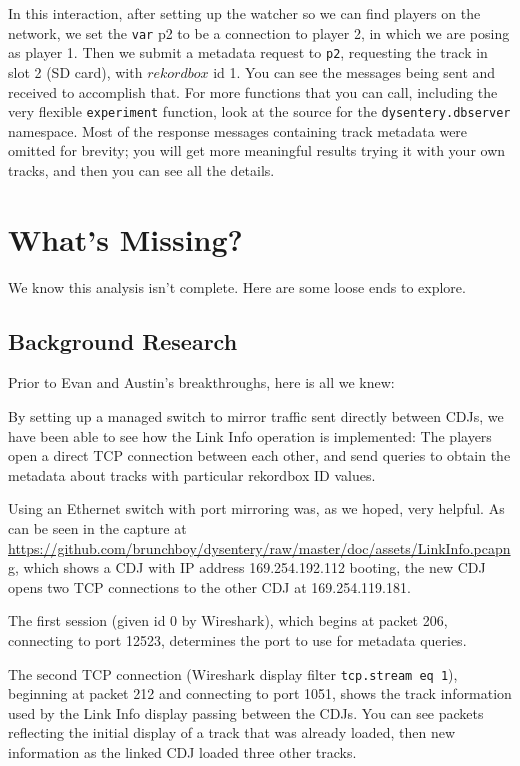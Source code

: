 \documentclass[11pt]{article}
\begin{document}
In this interaction, after setting up the watcher so we can find
players on the network, we set the {\tt var} p2 to be a connection to
player 2, in which we are posing as player 1. Then we submit a
metadata request to {\tt p2}, requesting the track in slot 2 (SD
card), with $rekordbox$ id 1. You can see the messages being sent and
received to accomplish that. For more functions that you can call,
including the very flexible {\tt experiment} function, look at the
source for the {\tt dysentery.dbserver} namespace. Most of the
response messages containing track metadata were omitted for brevity;
you will get more meaningful results trying it with your own tracks,
and then you can see all the details.

\section{What's Missing?}

We know this analysis isn't complete. Here are some loose ends to
explore.

\subsection{Background Research}

Prior to Evan and Austin's breakthroughs, here is all we knew:

By setting up a managed switch to mirror traffic sent directly between
CDJs, we have been able to see how the Link Info operation is
implemented: The players open a direct TCP connection between each
other, and send queries to obtain the metadata about tracks with
particular rekordbox ID values.

Using an Ethernet switch
with port mirroring was, as we hoped, very helpful. As can be seen in
the capture at
\url{https://github.com/brunchboy/dysentery/raw/master/doc/assets/LinkInfo.pcapng},
which shows a CDJ with IP address 169.254.192.112 booting, the new CDJ
opens two TCP connections to the other CDJ at 169.254.119.181.

The first session (given id 0 by Wireshark), which begins at packet
206, connecting to port 12523, determines the port to use for metadata
queries.

The second TCP connection (Wireshark display filter {\tt tcp.stream eq
  1}), beginning at packet 212 and connecting to port 1051, shows the
track information used by the Link Info display passing between the
CDJs. You can see packets reflecting the initial display of a track
that was already loaded, then new information as the linked CDJ loaded
three other tracks.
\end{document}
